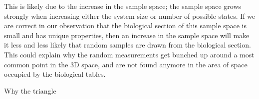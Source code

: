 \documentclass[../main.tex]{subfiles}
\begin{document}

This is likely due to the increase in the sample space; the sample space grows strongly when increasing either the system size or number of possible states.
If we are correct in our observation that the biological section of this sample space is small and has unique properties, then an increase in the sample space will make it less and less likely that random samples are drawn from the biological section.
This could explain why the random measurements get bunched up around a most common point in the 3D space, and are not found anymore in the area of space occupied by the biological tables.

Why the triangle
\end{document}
